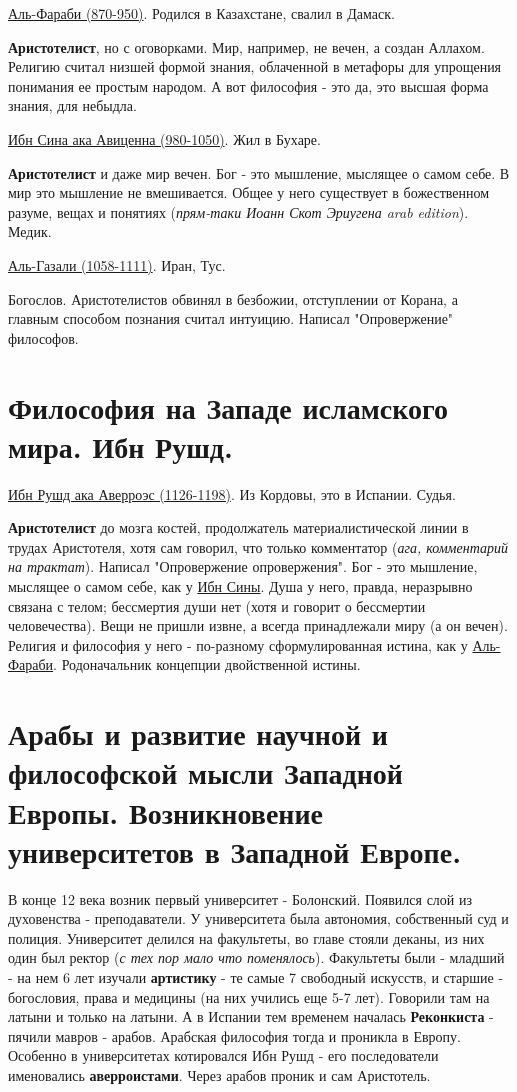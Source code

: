 \underline{Аль-Фараби (870-950)}. Родился в Казахстане, свалил в Дамаск.

\textbf{Аристотелист}, но с оговорками. Мир, например, не вечен, а создан Аллахом. Религию считал низшей формой знания, облаченной в метафоры для упрощения понимания ее простым народом. А вот философия - это да, это высшая форма знания, для небыдла.

\underline{Ибн Сина ака Авиценна (980-1050)}. Жил в Бухаре.


\textbf{Аристотелист} и даже мир вечен. Бог - это мышление, мыслящее о самом себе. В мир это мышление не вмешивается.
Общее у него существует в божественном разуме, вещах и понятиях (\textit{прям-таки Иоанн Скот Эриугена arab edition}). Медик.

\underline{Аль-Газали (1058-1111)}. Иран, Тус.

Богослов. Аристотелистов обвинял в безбожии, отступлении от Корана, а главным способом познания считал интуицию. Написал "Опровержение" философов.

\section{Философия на Западе исламского мира. Ибн Рушд.}
\hspace{8pt} 
\underline{Ибн Рушд ака Аверроэс (1126-1198)}. Из Кордовы, это в Испании. Судья.

\textbf{Аристотелист} до мозга костей, продолжатель материалистической линии в трудах Аристотеля, хотя сам говорил, что только комментатор (\textit{ага, комментарий на трактат}). Написал "Опровержение опровержения". Бог - это мышление, мыслящее о самом себе, как у \underline{Ибн Сины}. 
%
Душа у него, правда, неразрывно связана с телом; бессмертия души нет (хотя и говорит о бессмертии человечества). 
%
Вещи не пришли извне, а всегда принадлежали миру (а он вечен). Религия и философия у него - по-разному сформулированная истина, как у \underline{Аль-Фараби}. Родоначальник концепции двойственной истины.


\section{Арабы и развитие научной и философской мысли Западной Европы. Возникновение университетов в Западной Европе.}
В конце 12 века возник первый университет - Болонский. Появился слой из духовенства - преподаватели. У университета была автономия, собственный суд и полиция. Университет делился на факультеты, во главе стояли деканы, из них один был ректор (\textit{с тех пор мало что поменялось}). Факультеты были - младший - на нем 6 лет изучали \textbf{артистику} - те самые 7 свободный искусств, и старшие - богословия, права и медицины (на них учились еще 5-7 лет). Говорили там на латыни и только на латыни. 
А в Испании тем временем началась \textbf{Реконкиста} - пячили мавров - арабов. Арабская философия тогда и проникла в Европу. Особенно в университетах котировался Ибн Рушд - его последователи именовались \textbf{аверроистами}. Через арабов проник и сам Аристотель.

